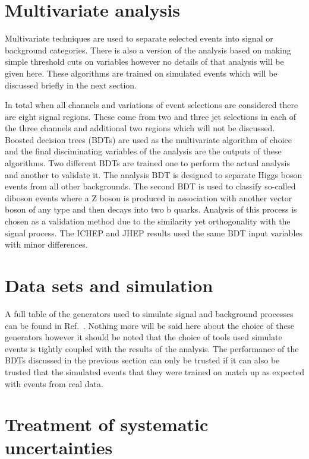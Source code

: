 \section{Multivariate analysis}

Multivariate techniques are used to separate selected events into signal or background categories.
There is also a version of the analysis based on making simple threshold cuts on variables however
no details of that analysis will be given here. These algorithms are trained on simulated events which
will be discussed briefly in the next section.

In total when all channels and variations of event selections are considered there are eight signal
regions. These come from two and three jet selections in each of the three channels and additional
two regions which will not be discussed. Boosted decision trees (BDTs) are used as the multivariate
algorithm of choice and the final disciminating variables of the analysis are the outputs of these
algorithms. Two different BDTs are trained one to perform the actual analysis and another to validate
it. The analysis BDT is designed to separate Higgs boson events from all other backgrounds. The second
BDT is used to classify so-called diboson events where a Z boson is produced in association with
another vector boson of any type and then decays into two b quarks. Analysis of this process is chosen
as a validation method due to the similarity yet orthogonality with the signal process. The ICHEP and
JHEP results used the same BDT input variables with minor differences.

\section{Data sets and simulation}

A full table of the generators used to simulate signal and background processes can be found in
Ref.~\cite{ATLAS-CONF-2018-036}. Nothing more will be said here about the choice of these generators
however it should be noted that the choice of tools used simulate events is tightly coupled with the
results of the analysis. The performance of the BDTs discussed in the previous section can only be
trusted if it can also be trusted that the simulated events that they were trained on match up as
expected with events from real data. 

\section{Treatment of systematic uncertainties}

